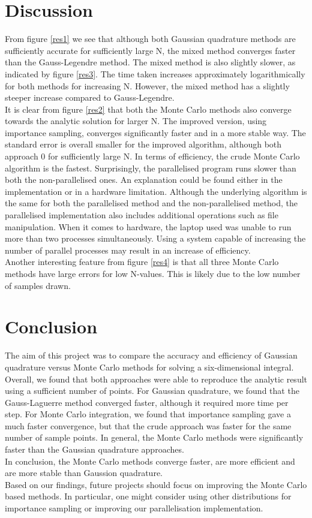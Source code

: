 \documentclass[notitlepage, reprint, nofootinbib]{revtex4-1}
\begin{document}
\section{Discussion}
From figure \ref{res1} we see that although both Gaussian quadrature methods are sufficiently accurate for sufficiently large N, the mixed method converges faster than the Gauss-Legendre method. The mixed method is also slightly slower, as indicated by figure \ref{res3}. The time taken increases approximately logarithmically for both methods for increasing N. However, the mixed method has a slightly steeper increase compared to Gauss-Legendre.\\[2mm]
It is clear from figure \ref{res2} that both the Monte Carlo methods also converge towards the analytic solution for larger N. The improved version, using importance sampling, converges significantly faster and in a more stable way. The standard error is overall smaller for the improved algorithm, although both approach 0 for sufficiently large N.\newpage
In terms of efficiency, the crude Monte Carlo algorithm is the fastest. Surprisingly, the parallelised program runs slower than both the non-parallelised ones. An explanation could be found either in the implementation or in a hardware limitation. Although the underlying algorithm is the same for both the parallelised method and the non-parallelised method, the parallelised implementation also includes additional operations such as file manipulation. When it comes to hardware, the laptop used was unable to run more than two processes simultaneously. Using a system capable of increasing the number of parallel processes may result in an increase of efficiency.\\[2mm]
Another interesting feature from figure \ref{res4} is that all three Monte Carlo methods have large errors for low N-values. This is likely due to the low number of samples drawn.
\section{Conclusion}
The aim of this project was to compare the accuracy and efficiency of Gaussian quadrature versus Monte Carlo methods for solving a six-dimensional integral. Overall, we found that both approaches were able to reproduce the analytic result using a sufficient number of points. For Gaussian quadrature, we found that the Gauss-Laguerre method converged faster, although it required more time per step. For Monte Carlo integration, we found that importance sampling gave a much faster convergence, but that the crude approach was faster for the same number of sample points. In general, the Monte Carlo methods were significantly faster than the Gaussian quadrature approaches.\\[2mm]
In conclusion, the Monte Carlo methods converge faster, are more efficient and are more stable than Gaussion quadrature.\\[2mm]
Based on our findings, future projects should focus on improving the Monte Carlo based methods. In particular, one might consider using other distributions for importance sampling or improving our parallelisation implementation.
\onecolumngrid


\end{document}
